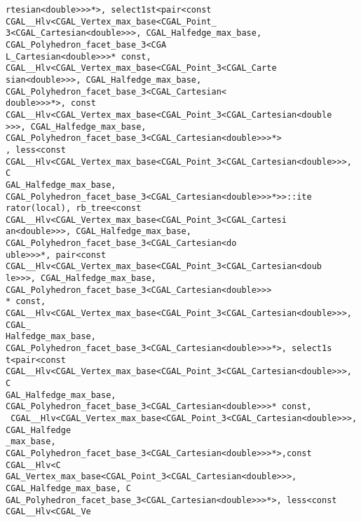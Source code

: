 \begin{titlepage}
\begin{lcTexBlock}
{\verb+rtesian<double>>>*>, select1st<pair<const CGAL__Hlv<CGAL_Vertex_max_base<CGAL_Point_+\\
\verb+3<CGAL_Cartesian<double>>>, CGAL_Halfedge_max_base, CGAL_Polyhedron_facet_base_3<CGA+\\
\verb+L_Cartesian<double>>>* const, CGAL__Hlv<CGAL_Vertex_max_base<CGAL_Point_3<CGAL_Carte+\\
\verb+sian<double>>>, CGAL_Halfedge_max_base, CGAL_Polyhedron_facet_base_3<CGAL_Cartesian<+\\
\verb+double>>>*>, const CGAL__Hlv<CGAL_Vertex_max_base<CGAL_Point_3<CGAL_Cartesian<double+\\
\verb+>>>, CGAL_Halfedge_max_base, CGAL_Polyhedron_facet_base_3<CGAL_Cartesian<double>>>*>+\\
\verb+, less<const CGAL__Hlv<CGAL_Vertex_max_base<CGAL_Point_3<CGAL_Cartesian<double>>>, C+\\
\verb+GAL_Halfedge_max_base, CGAL_Polyhedron_facet_base_3<CGAL_Cartesian<double>>>*>>::ite+\\
\verb+rator(local), rb_tree<const CGAL__Hlv<CGAL_Vertex_max_base<CGAL_Point_3<CGAL_Cartesi+\\
\verb+an<double>>>, CGAL_Halfedge_max_base, CGAL_Polyhedron_facet_base_3<CGAL_Cartesian<do+\\
\verb+uble>>>*, pair<const CGAL__Hlv<CGAL_Vertex_max_base<CGAL_Point_3<CGAL_Cartesian<doub+\\
\verb+le>>>, CGAL_Halfedge_max_base, CGAL_Polyhedron_facet_base_3<CGAL_Cartesian<double>>>+\\
\verb+* const, CGAL__Hlv<CGAL_Vertex_max_base<CGAL_Point_3<CGAL_Cartesian<double>>>, CGAL_+\\
\verb+Halfedge_max_base, CGAL_Polyhedron_facet_base_3<CGAL_Cartesian<double>>>*>, select1s+\\
\verb+t<pair<const CGAL__Hlv<CGAL_Vertex_max_base<CGAL_Point_3<CGAL_Cartesian<double>>>, C+\\
\verb+GAL_Halfedge_max_base, CGAL_Polyhedron_facet_base_3<CGAL_Cartesian<double>>>* const,+\\
\verb+ CGAL__Hlv<CGAL_Vertex_max_base<CGAL_Point_3<CGAL_Cartesian<double>>>, CGAL_Halfedge+\\
\verb+_max_base, CGAL_Polyhedron_facet_base_3<CGAL_Cartesian<double>>>*>,const CGAL__Hlv<C+\\
\verb+GAL_Vertex_max_base<CGAL_Point_3<CGAL_Cartesian<double>>>, CGAL_Halfedge_max_base, C+\\
\verb+GAL_Polyhedron_facet_base_3<CGAL_Cartesian<double>>>*>, less<const CGAL__Hlv<CGAL_Ve+\\
}
\end{lcTexBlock}
\end{titlepage}
